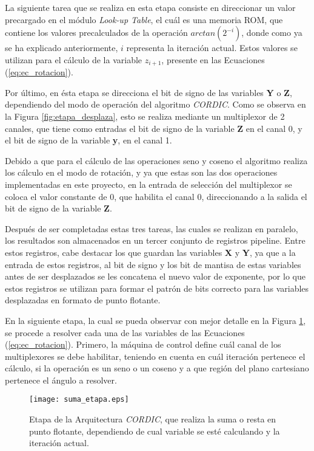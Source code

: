 La siguiente tarea que se realiza en esta etapa consiste en direccionar un valor precargado en el módulo \textit{Look-up Table}, el cuál es una memoria ROM, que contiene los valores precalculados de la operación $arctan(2^{-i})$, donde como ya se ha explicado anteriormente, $i$ representa la iteración actual. Estos valores se utilizan para el cálculo de la variable $z_{i+1}$, presente en las Ecuaciones (\ref{eq:ec_rotacion}).

Por último, en ésta etapa se direcciona el bit de signo de las variables \textbf{Y} o \textbf{Z}, dependiendo del modo de operación del algoritmo \textit{CORDIC}. Como se observa en la Figura \ref{fig:etapa_desplaza}, esto se realiza mediante un multiplexor de 2 canales, que tiene como entradas el bit de signo de la variable \textbf{Z} en el canal 0, y el bit de signo de la variable \textbf{y}, en el canal 1.

Debido a que para el cálculo de las operaciones seno y coseno el algoritmo realiza los cálculo en el modo de rotación, y ya que estas son las dos operaciones implementadas en este proyecto, en la entrada de selección del multiplexor se coloca el valor constante de 0, que habilita el canal 0, direccionando a la salida el bit de signo de la variable \textbf{Z}.

Después de ser completadas estas tres tareas, las cuales se realizan en paralelo, los resultados son almacenados en un tercer conjunto de registros pipeline. Entre estos registros, cabe destacar los que guardan las variables \textbf{X} y \textbf{Y}, ya que a la entrada de estos registros, al bit de signo y los bit de mantisa de estas variables antes de ser desplazados se les concatena el nuevo valor de exponente, por lo que estos registros se utilizan para formar el patrón de bits correcto para las variables desplazadas en formato de punto flotante.

En la siguiente etapa, la cual se pueda observar con mejor detalle en la Figura \ref{fig:etapa_suma}, se procede a resolver cada una de las variables de las Ecuaciones (\ref{eq:ec_rotacion}). Primero, la máquina de control define cuál canal de los multiplexores se debe habilitar, teniendo en cuenta en cuál iteración pertenece el cálculo, si la operación es un seno o un coseno y a que región del plano cartesiano pertenece el ángulo a resolver.

\begin{figure}[H]
  \centering
  \texttt{[image: suma\_etapa.eps]}
  \caption{Etapa de la Arquitectura \textit{CORDIC}, que realiza la suma o resta en punto flotante, dependiendo de cual variable se esté calculando y la iteración actual.}
  \label{fig:etapa_suma}
\end{figure}

